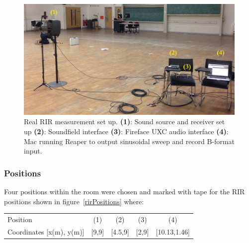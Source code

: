 \documentclass[../../main.tex]{subfiles}
\begin{document}
		\begin{figure}[H]
			\begin{center}
				\includegraphics[scale = 0.14]{Sections/Implementation/RealRIRs/images/realRIRSetup_edit.jpg} 
				\caption{Real \ac{RIR} measurement set up. \textbf{(1)}: Sound source and receiver set up \textbf{(2)}: Soundfield interface \textbf{(3)}: Fireface UXC audio interface \textbf{(4)}: Mac running Reaper to output sinusoidal sweep and record B-format input.}
				\label{realRIRSetup}
			\end{center}
		\end{figure}

	\subsubsection{Positions}

		Four positions within the room were chosen and marked with tape for the \ac{RIR} positions shown in figure~\ref{rirPositions} where:

		\begin{center}
			\begin{tabular}{l| c c c c}
				Position & (1) & (2) & (3) & (4) \\
			Coordinates [x(m), y(m)] & [9,9] & [4.5,9] & [2,9] &  [10.13,1.46]\\
			\end{tabular}
		\end{center}
\end{document}
